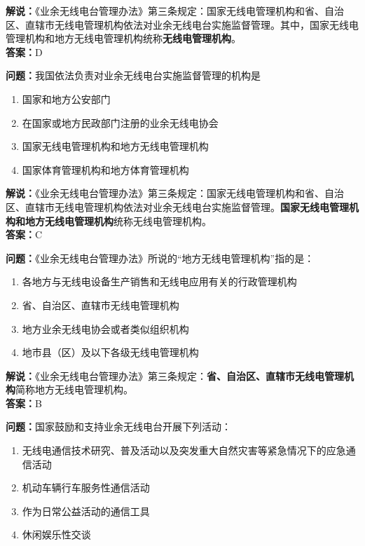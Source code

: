 \noindent\textbf{解说：}《业余无线电台管理办法》第三条规定：国家无线电管理机构和省、自治区、直辖市无线电管理机构依法对业余无线电台实施监督管理。其中，国家无线电管理机构和地方无线电管理机构统称\textbf{无线电管理机构}。\\\noindent\textbf{答案：}D

\bigskip


\noindent\textbf{问题：}我国依法负责对业余无线电台实施监督管理的机构是

\begin{enumerate}[label=\Alph*), leftmargin=3em]
	\item 国家和地方公安部门
	\item 在国家或地方民政部门注册的业余无线电协会
	\item 国家无线电管理机构和地方无线电管理机构
	\item 国家体育管理机构和地方体育管理机构
\end{enumerate}

\noindent\textbf{解说：}《业余无线电台管理办法》第三条规定：国家无线电管理机构和省、自治区、直辖市无线电管理机构依法对业余无线电台实施监督管理。\textbf{国家无线电管理机构和地方无线电管理机构}统称无线电管理机构。\\\noindent\textbf{答案：}C

\bigskip


\noindent\textbf{问题：}《业余无线电台管理办法》所说的“地方无线电管理机构”指的是：

\begin{enumerate}[label=\Alph*), leftmargin=3em]
	\item 各地方与无线电设备生产销售和无线电应用有关的行政管理机构
	\item 省、自治区、直辖市无线电管理机构
	\item 地方业余无线电协会或者类似组织机构
	\item 地市县（区）及以下各级无线电管理机构
\end{enumerate}

\noindent\textbf{解说：}《业余无线电台管理办法》第三条规定：\textbf{省、自治区、直辖市无线电管理机构}简称地方无线电管理机构。\\\noindent\textbf{答案：}B

\bigskip


\noindent\textbf{问题：}国家鼓励和支持业余无线电台开展下列活动：

\begin{enumerate}[label=\Alph*), leftmargin=3em]
	\item 无线电通信技术研究、普及活动以及突发重大自然灾害等紧急情况下的应急通信活动
	\item 机动车辆行车服务性通信活动
	\item 作为日常公益活动的通信工具
	\item 休闲娱乐性交谈
\end{enumerate}

